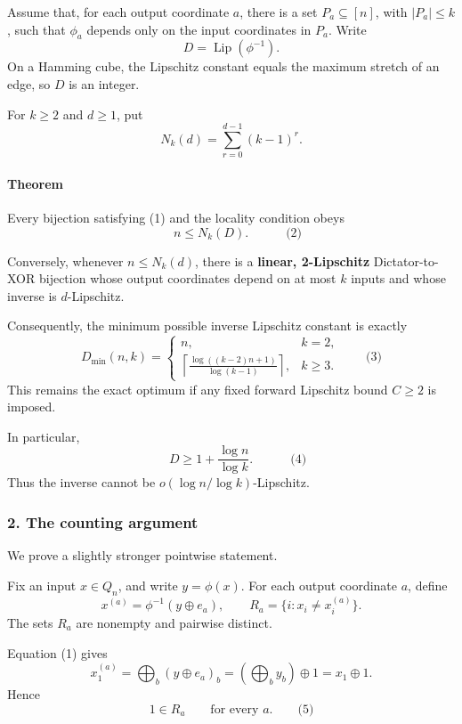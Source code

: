 \documentclass[
  11pt,
  a4paper,
]{article}
\newcounter{none} %
\begin{document}
Assume that, for each output coordinate \(a\), there is a set
\(P_a\subseteq[n]\), with \(|P_a|\le k\), such that \(\phi_a\) depends
only on the input coordinates in \(P_a\). Write \[
D=\operatorname{Lip}(\phi^{-1}).
\] On a Hamming cube, the Lipschitz constant equals the maximum stretch
of an edge, so \(D\) is an integer.

For \(k\ge2\) and \(d\ge1\), put \[
N_k(d)=\sum_{r=0}^{d-1}(k-1)^r.
\]

\paragraph{Theorem}\label{theorem}

Every bijection satisfying (1) and the locality condition obeys \[
\boxed{\quad n\le N_k(D).\quad}                       \qquad\text{(2)}
\]

Conversely, whenever \(n\le N_k(d)\), there is a \textbf{linear,
2-Lipschitz} Dictator-to-XOR bijection whose output coordinates depend
on at most \(k\) inputs and whose inverse is \(d\)-Lipschitz.

Consequently, the minimum possible inverse Lipschitz constant is exactly
\[
\boxed{
D_{\min}(n,k)=
\begin{cases}
n, & k=2,\\[2mm]
\displaystyle
\left\lceil
\frac{\log((k-2)n+1)}{\log(k-1)}
\right\rceil, & k\ge3.
\end{cases}}                                         \qquad\text{(3)}
\] This remains the exact optimum if any fixed forward Lipschitz bound
\(C\ge2\) is imposed.

In particular, \[
\boxed{\quad D\ge 1+\frac{\log n}{\log k}.\quad}       \qquad\text{(4)}
\] Thus the inverse cannot be \(o(\log n/\log k)\)-Lipschitz.

\subsubsection{2. The counting argument}\label{the-counting-argument}

We prove a slightly stronger pointwise statement.

Fix an input \(x\in Q_n\), and write \(y=\phi(x)\). For each output
coordinate \(a\), define \[
x^{(a)}=\phi^{-1}(y\oplus e_a),
\qquad
R_a=\{i:x_i\ne x_i^{(a)}\}.
\] The sets \(R_a\) are nonempty and pairwise distinct.

Equation (1) gives \[
x^{(a)}_1
=\bigoplus_b (y\oplus e_a)_b
=\left(\bigoplus_b y_b\right)\oplus1
=x_1\oplus1.
\] Hence \[
1\in R_a\qquad\text{for every }a.                    \qquad\text{(5)}
\]
\end{document}
